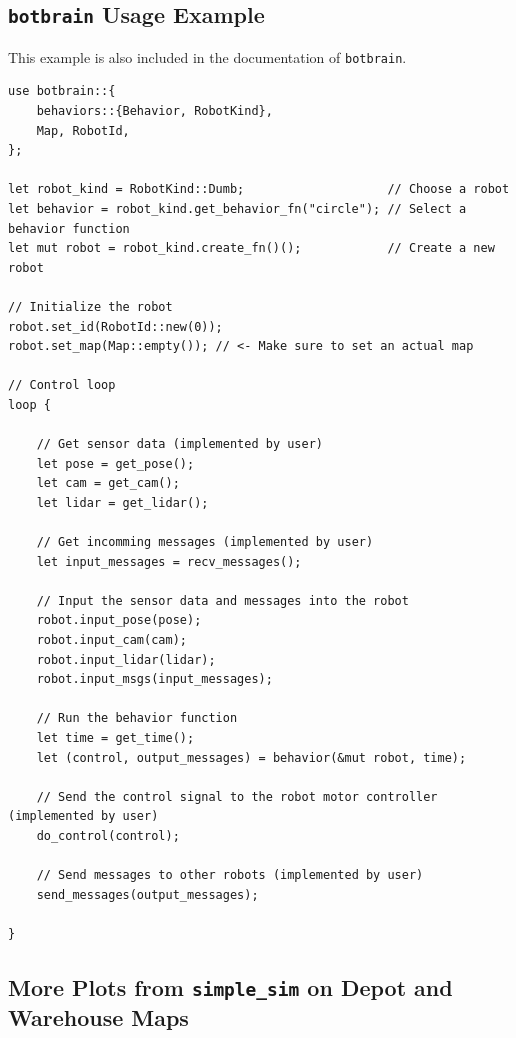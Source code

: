 \subsection{\texttt{botbrain} Usage Example}
This example is also included in the documentation of \texttt{botbrain}.
\begin{verbatim}
use botbrain::{
    behaviors::{Behavior, RobotKind},
    Map, RobotId,
};

let robot_kind = RobotKind::Dumb;                    // Choose a robot
let behavior = robot_kind.get_behavior_fn("circle"); // Select a behavior function
let mut robot = robot_kind.create_fn()();            // Create a new robot

// Initialize the robot
robot.set_id(RobotId::new(0));
robot.set_map(Map::empty()); // <- Make sure to set an actual map

// Control loop
loop {

    // Get sensor data (implemented by user)
    let pose = get_pose();
    let cam = get_cam();
    let lidar = get_lidar();

    // Get incomming messages (implemented by user)
    let input_messages = recv_messages();

    // Input the sensor data and messages into the robot
    robot.input_pose(pose);
    robot.input_cam(cam);
    robot.input_lidar(lidar);
    robot.input_msgs(input_messages);

    // Run the behavior function
    let time = get_time();
    let (control, output_messages) = behavior(&mut robot, time);

    // Send the control signal to the robot motor controller (implemented by user)
    do_control(control);

    // Send messages to other robots (implemented by user)
    send_messages(output_messages);

}
\end{verbatim}

\stopcontents[inner]

\newpage
\subsection{More Plots from \texttt{simple\_sim} on Depot and Warehouse Maps}

\def\w{0.45\textwidth}

